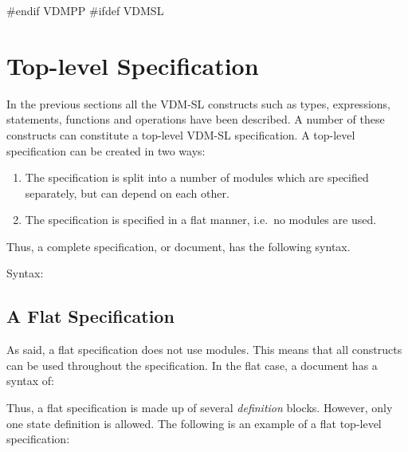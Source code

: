 \documentclass[\pformat,12pt]{article}
\begin{document}
#endif VDMPP
#ifdef VDMSL
\newpage
\section{Top-level Specification}
\label{top-level}\label{modules}

In the previous sections all the  VDM-SL constructs such as types,
expressions, statements, functions and operations have been described. A
number of these constructs can constitute a top-level  VDM-SL
specification. A top-level specification can be created in two ways:
\begin{enumerate}
\item The specification is split into a number of modules which are
  specified separately, but can depend on each other.
\item The specification is specified in a flat manner, i.e.\ no modules are
  used.
\end{enumerate}
Thus, a complete specification, or document, has the following syntax.

\begin{description}
\item[Syntax:]

\end{description}

\subsection{A Flat Specification}\label{flat}

As said, a flat specification does not use modules. This means that all
constructs can be used throughout the specification. In the flat case, a
document has a syntax of:



Thus, a flat specification is made up of several {\it definition\/} blocks.
However, only one state definition is allowed. The following is an example
of a flat top-level specification:
\end{document}
